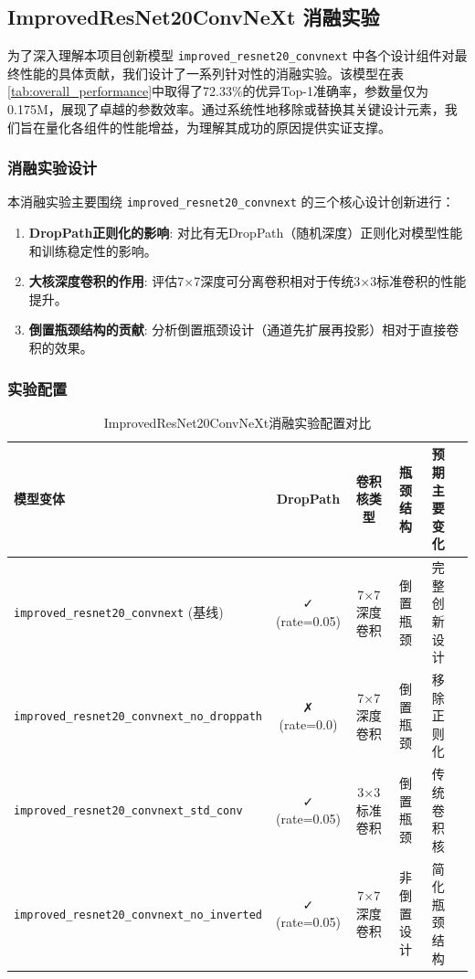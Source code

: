 \documentclass[a4paper]{article}
\begin{document}
\subsection{ImprovedResNet20ConvNeXt 消融实验}
为了深入理解本项目创新模型 \texttt{improved\_resnet20\_convnext} 中各个设计组件对最终性能的具体贡献，我们设计了一系列针对性的消融实验。该模型在表\ref{tab:overall_performance}中取得了72.33\%的优异Top-1准确率，参数量仅为0.175M，展现了卓越的参数效率。通过系统性地移除或替换其关键设计元素，我们旨在量化各组件的性能增益，为理解其成功的原因提供实证支撑。

\subsubsection{消融实验设计}
本消融实验主要围绕 \texttt{improved\_resnet20\_convnext} 的三个核心设计创新进行：
\begin{enumerate}
    \item \textbf{DropPath正则化的影响}: 对比有无DropPath（随机深度）正则化对模型性能和训练稳定性的影响。
    \item \textbf{大核深度卷积的作用}: 评估7×7深度可分离卷积相对于传统3×3标准卷积的性能提升。
    \item \textbf{倒置瓶颈结构的贡献}: 分析倒置瓶颈设计（通道先扩展再投影）相对于直接卷积的效果。
\end{enumerate}

\subsubsection{实验配置}
\begin{table}[H]
\centering
\caption{ImprovedResNet20ConvNeXt消融实验配置对比}
\label{tab:improved_ablation_config}
\begin{tabular}{lccccl}
\toprule
\textbf{模型变体} & \textbf{DropPath} & \textbf{卷积核类型} & \textbf{瓶颈结构} & \textbf{预期主要变化} \\
\midrule
\texttt{improved\_resnet20\_convnext} (基线) & ✓ (rate=0.05) & 7×7深度卷积 & 倒置瓶颈 & 完整创新设计 \\
\texttt{improved\_resnet20\_convnext\_no\_droppath} & ✗ (rate=0.0) & 7×7深度卷积 & 倒置瓶颈 & 移除正则化 \\
\texttt{improved\_resnet20\_convnext\_std\_conv} & ✓ (rate=0.05) & 3×3标准卷积 & 倒置瓶颈 & 传统卷积核 \\
\texttt{improved\_resnet20\_convnext\_no\_inverted} & ✓ (rate=0.05) & 7×7深度卷积 & 非倒置设计 & 简化瓶颈结构 \\
\bottomrule
\end{tabular}
\end{table}
\end{document}
